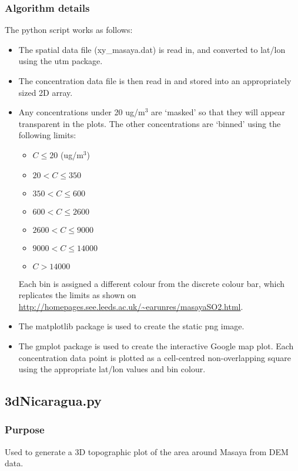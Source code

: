 \documentclass[10pt,a4paper]{article}
\begin{document}
\subsubsection{Algorithm details}
The python script works as follows:
\begin{itemize}
\item The spatial data file (xy\_masaya.dat) is read in, and converted to lat/lon using the utm package.
\item The concentration data file is then read in and stored into an appropriately sized 2D array.
\item Any concentrations under 20 ug/m$^3$ are `masked' so that they will appear transparent in the plots. The other concentrations are `binned' using the following limits:
\begin{itemize}
\item $C \leq 20$ (ug/m$^3$)
\item $20 < C \leq 350$
\item $350 < C \leq 600$
\item $600 < C \leq 2600$
\item $2600 < C \leq 9000$
\item $9000 < C \leq 14000$
\item $C > 14000$
\end{itemize}
Each bin is assigned a different colour from the discrete colour bar, which replicates the limits as shown on \url{http://homepages.see.leeds.ac.uk/~earunres/masayaSO2.html}.
\item The matplotlib package is used to create the static png image.
\item The gmplot package is used to create the interactive Google map plot. Each concentration data point is plotted as a cell-centred non-overlapping square using the appropriate lat/lon values and bin colour.
\end{itemize}



\subsection{3dNicaragua.py}

\subsubsection{Purpose}

Used to generate a 3D topographic plot of the area around Masaya from DEM data.
\end{document}
